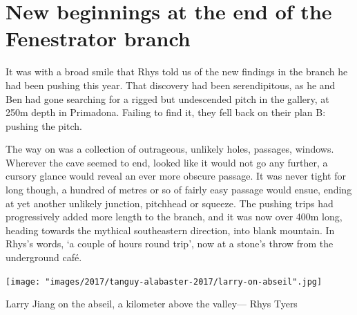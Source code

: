 \section{New beginnings at the end of the Fenestrator branch}

\begin{marginfigure}
\end{marginfigure}


It was with a broad smile that Rhys told us of the new findings in the  branch he had been pushing this year. That discovery had been serendipitous, as he and Ben had gone searching for a rigged but undescended pitch in the  gallery, at 250m depth in \passage[cave]Primadona. Failing to find it, they fell back on their plan B: pushing the  pitch.

The way on was a collection of  outrageous, unlikely holes, passages, windows. Wherever the cave seemed to end, looked like it would not go any further, a cursory glance would reveal an ever more obscure passage. It was never tight for long though, a hundred of metres or so of fairly easy passage would ensue, ending at yet another unlikely junction, pitchhead or squeeze. The pushing trips had progressively added more length to the branch, and it was now over 400m long, heading towards the mythical southeastern direction, into blank mountain. In Rhys's words, `a couple of hours round trip', now at a stone's throw from the underground café. 

\begin{marginfigure} \centering \vspace{-115pt}
\texttt{[image: "images/2017/tanguy-alabaster-2017/larry-on-abseil".jpg]}
\caption{Larry Jiang on the  abseil, a kilometer above the \protect{} valley--- Rhys Tyers}
\end{marginfigure}

